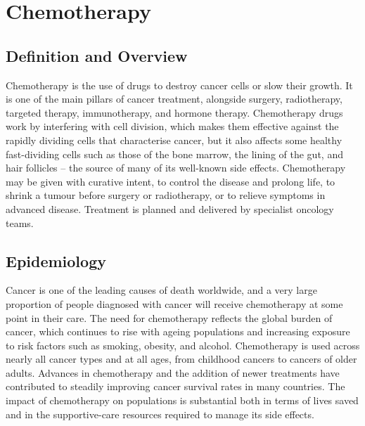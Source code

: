 \chapter{Chemotherapy}

\section*{Definition and Overview}
Chemotherapy is the use of drugs to destroy cancer cells or slow their growth. It is one of the main pillars of cancer treatment, alongside surgery, radiotherapy, targeted therapy, immunotherapy, and hormone therapy. Chemotherapy drugs work by interfering with cell division, which makes them effective against the rapidly dividing cells that characterise cancer, but it also affects some healthy fast-dividing cells such as those of the bone marrow, the lining of the gut, and hair follicles -- the source of many of its well-known side effects. Chemotherapy may be given with curative intent, to control the disease and prolong life, to shrink a tumour before surgery or radiotherapy, or to relieve symptoms in advanced disease. Treatment is planned and delivered by specialist oncology teams.

\section*{Epidemiology}
Cancer is one of the leading causes of death worldwide, and a very large proportion of people diagnosed with cancer will receive chemotherapy at some point in their care. The need for chemotherapy reflects the global burden of cancer, which continues to rise with ageing populations and increasing exposure to risk factors such as smoking, obesity, and alcohol. Chemotherapy is used across nearly all cancer types and at all ages, from childhood cancers to cancers of older adults. Advances in chemotherapy and the addition of newer treatments have contributed to steadily improving cancer survival rates in many countries. The impact of chemotherapy on populations is substantial both in terms of lives saved and in the supportive-care resources required to manage its side effects.

